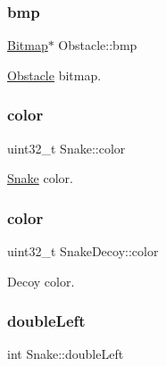 \mbox{\label{group__snake_ga97d18d6a1e7337ec4126c187a74074b7}} 
\subsubsection{\texorpdfstring{bmp}{bmp}\hspace{0.1cm}{\footnotesize\ttfamily [2/2]}}
{\footnotesize\ttfamily \mbox{\hyperlink{struct_bitmap}{Bitmap}}$\ast$ Obstacle\+::bmp}



\mbox{\hyperlink{struct_obstacle}{Obstacle}} bitmap. 

\mbox{\label{group__snake_gaeaaf26de3f02db45a8bab738d4b2ca64}} 
\subsubsection{\texorpdfstring{color}{color}\hspace{0.1cm}{\footnotesize\ttfamily [1/2]}}
{\footnotesize\ttfamily uint32\+\_\+t Snake\+::color}



\mbox{\hyperlink{struct_snake}{Snake}} color. 

\mbox{\label{group__snake_ga5234b4454a0f59fc2aac841aeb03fbe9}} 
\subsubsection{\texorpdfstring{color}{color}\hspace{0.1cm}{\footnotesize\ttfamily [2/2]}}
{\footnotesize\ttfamily uint32\+\_\+t Snake\+Decoy\+::color}



Decoy color. 

\mbox{\label{group__snake_gadc6fa6383ebace6fbeb2e6a2ebcbb04a}} 
\subsubsection{\texorpdfstring{double\+Left}{doubleLeft}}
{\footnotesize\ttfamily int Snake\+::double\+Left}



